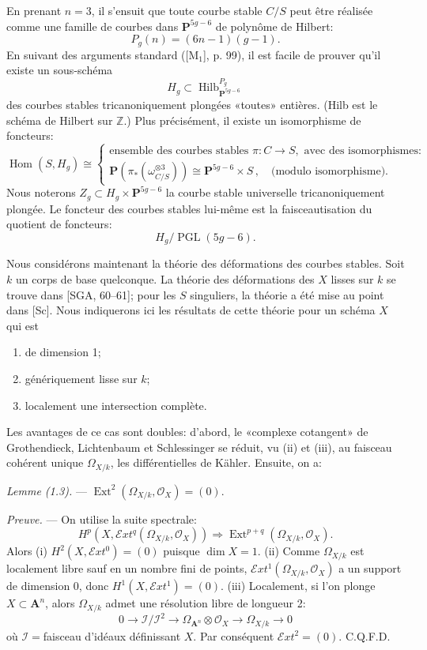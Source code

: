 \documentclass[10pt]{article}
\newcommand{\Hom}{\operatorname{Hom}}
\newcommand{\Ext}{\operatorname{Ext}}
\newcommand{\PGL}{\operatorname{PGL}}
\newcommand{\Hilb}{\operatorname{Hilb}}
\newcommand{\cO}{\mathcal O}
\newcommand{\cI}{\mathcal I}
\newcommand{\cExt}{\mathcal{E}xt}
\newcommand{\A}{\mathbf A}
\newcommand{\PP}{\mathbf P}
\begin{document}
En prenant $n=3$, il s'ensuit que toute courbe stable $C/S$ peut être réalisée comme une famille de courbes dans $\PP^{5g-6}$ de polynôme de Hilbert:
\[
P_g(n)=(6n-1)(g-1).
\]
En suivant des arguments standard ([M$_1$], p. 99), il est facile de prouver qu'il existe un sous-schéma
\[
H_g\subset \Hilb_{\PP^{5g-6}}^{P_g}
\]
des courbes stables tricanoniquement plongées «toutes» entières. (Hilb est le schéma de Hilbert sur $\mathbb Z$.) Plus précisément, il existe un isomorphisme de foncteurs:
\[
\Hom(S,H_g)\cong
\left\{
\begin{array}{l}
\text{ensemble des courbes stables }\pi:C\to S,\text{ avec des isomorphismes:}\\[2pt]
\PP(\pi_*(\omega_{C/S}^{\otimes 3}))\cong \PP^{5g-6}\times S\,,\quad\text{(modulo isomorphisme).}
\end{array}
\right.
\]
Nous noterons $Z_g\subset H_g\times \PP^{5g-6}$ la courbe stable universelle tricanoniquement plongée. Le foncteur des courbes stables lui-même est la faisceautisation du quotient de foncteurs:
\[
H_g/\PGL(5g-6).
\]

Nous considérons maintenant la théorie des déformations des courbes stables. Soit $k$ un corps de base quelconque. La théorie des déformations des $X$ lisses sur $k$ se trouve dans [SGA, 60--61]; pour les $S$ singuliers, la théorie a été mise au point dans [Sc]. Nous indiquerons ici les résultats de cette théorie pour un schéma $X$ qui est
\begin{enumerate}[label=(\roman*)]
\item de dimension 1;
\item génériquement lisse sur $k$;
\item localement une intersection complète.
\end{enumerate}
Les avantages de ce cas sont doubles: d'abord, le «complexe cotangent» de Grothendieck, Lichtenbaum et Schlessinger se réduit, vu (ii) et (iii), au faisceau cohérent unique $\Omega_{X/k}$, les différentielles de Kähler. Ensuite, on a:

\medskip
\noindent\textit{Lemme (1.3).} --- $\Ext^2(\Omega_{X/k},\cO_X)=(0)$.

\medskip
\noindent\textit{Preuve.} --- On utilise la suite spectrale:
\[
H^p(X,\cExt^q(\Omega_{X/k},\cO_X))\Rightarrow \Ext^{p+q}(\Omega_{X/k},\cO_X).
\]
Alors (i) $H^2(X,\cExt^0)=(0)$ puisque $\dim X=1$. (ii) Comme $\Omega_{X/k}$ est localement libre sauf en un nombre fini de points, $\cExt^1(\Omega_{X/k},\cO_X)$ a un support de dimension 0, donc $H^1(X,\cExt^1)=(0)$. (iii) Localement, si l'on plonge $X\subset\A^n$, alors $\Omega_{X/k}$ admet une résolution libre de longueur 2:
\[
0\to \cI/\cI^2\to \Omega_{\A^n}\otimes \cO_X\to \Omega_{X/k}\to 0
\]
où $\cI={}$faisceau d'idéaux définissant $X$. Par conséquent $\cExt^2=(0)$. C.Q.F.D.
\end{document}
